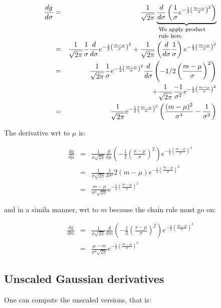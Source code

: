 \documentclass{article}
\newcommand{\explain}[2]{\underbrace{{#1}}_{\parbox{\widthof{\ensuremath{#1}}}{\footnotesize\raggedright #2}}}
\begin{document}
\begin{eqnarray}
	\frac{d g}{d \sigma}&=&\frac{1}{\sqrt{2 \pi}} \explain{\frac{d}{d \sigma}\left( \frac{1}{\sigma} e^{-\frac{1}{2} \left(\frac{m - \mu}{\sigma}\right)^2} \right)}{We apply product rule here}\\
	&=&\frac{1}{\sqrt{2 \pi}} \frac{1}{\sigma} \frac{d}{d \sigma} e^{-\frac{1}{2} \left(\frac{m - \mu}{\sigma}\right)^2}+
	\frac{1}{\sqrt{2 \pi}} \left( \frac{d}{d \sigma} \frac{1}{\sigma} \right) e^{-\frac{1}{2} \left(\frac{m - \mu}{\sigma}\right)^2}\\
	&=&\frac{1}{\sqrt{2 \pi}} \frac{1}{\sigma} e^{-\frac{1}{2} \left(\frac{m - \mu}{\sigma}\right)^2} \frac{d}{d \sigma} \left(-1/2 \left(\frac{m - \mu}{\sigma} \right)^2 \right) \nonumber \\&&+ \frac{1}{\sqrt{2 \pi}} \frac{-1}{\sigma^2} e^{-\frac{1}{2} \left(\frac{m - \mu}{\sigma}\right)^2}\\
	&=&\frac{1}{\sqrt{2 \pi}} e^{-\frac{1}{2} \left(\frac{m - \mu}{\sigma}\right)^2} \left( \frac{(m-\mu)^2}{\sigma^4}  - \frac{1}{\sigma ^2} \right)
\end{eqnarray}

The derivative wrt to $\mu$ is:

\begin{eqnarray}
	\frac{d g}{d \mu}&=&\frac{1}{\sigma \sqrt{2 \pi}}\frac{d}{d \mu}\left( -\frac{1}{2} \left(\frac{x-\mu}{\sigma}\right)^2 \right) e^{-\frac{1}{2} \left(\frac{m - \mu}{\sigma}\right)^2} \\
	&=&\frac{1}{\sigma \sqrt{2 \pi}} \frac{1}{2 \sigma ^2} 2 (m-\mu)  e^{-\frac{1}{2} \left(\frac{m - \mu}{\sigma}\right)^2}\\
	&=& \frac{m - \mu}{\sigma ^3 \sqrt{2 \pi}} e^{-\frac{1}{2} \left(\frac{m - \mu}{\sigma}\right)^2}
\end{eqnarray}	


and in a simila manner, wrt to $m$ because the chain rule must go on:

\begin{eqnarray}
	\frac{d g}{d m}&=&\frac{1}{\sigma \sqrt{2 \pi}}\frac{d}{d m}\left( -\frac{1}{2} \left(\frac{x-\mu}{\sigma}\right)^2 \right) e^{-\frac{1}{2} \left(\frac{m - \mu}{\sigma}\right)^2} \\
	&=& \frac{\mu-m}{\sigma ^3 \sqrt{2 \pi}} e^{-\frac{1}{2} \left(\frac{m - \mu}{\sigma}\right)^2}
\end{eqnarray}	


\subsection{Unscaled Gaussian derivatives}
One can compute	the unscaled versions, that is:
\end{document}
